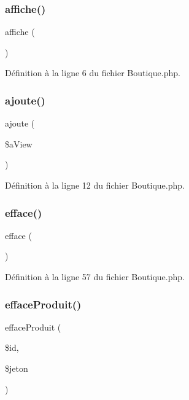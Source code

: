 \subsubsection{\texorpdfstring{affiche()}{affiche()}}
{\footnotesize\ttfamily affiche (\begin{DoxyParamCaption}{ }\end{DoxyParamCaption})}



Définition à la ligne 6 du fichier Boutique.\+php.

\mbox{\label{class_boutique_a473cc69fd3a08a9e73f263bbc0d38f2c}} 
\subsubsection{\texorpdfstring{ajoute()}{ajoute()}}
{\footnotesize\ttfamily ajoute (\begin{DoxyParamCaption}\item[{}]{\$a\+View }\end{DoxyParamCaption})}



Définition à la ligne 12 du fichier Boutique.\+php.

\mbox{\label{class_boutique_a134b4b8e3a367ce837cfefa39fdecedf}} 
\subsubsection{\texorpdfstring{efface()}{efface()}}
{\footnotesize\ttfamily efface (\begin{DoxyParamCaption}{ }\end{DoxyParamCaption})}



Définition à la ligne 57 du fichier Boutique.\+php.

\mbox{\label{class_boutique_a0f210229b72863c53bb688ae89573590}} 
\subsubsection{\texorpdfstring{efface\+Produit()}{effaceProduit()}}
{\footnotesize\ttfamily efface\+Produit (\begin{DoxyParamCaption}\item[{}]{\$id,  }\item[{}]{\$jeton }\end{DoxyParamCaption})}



